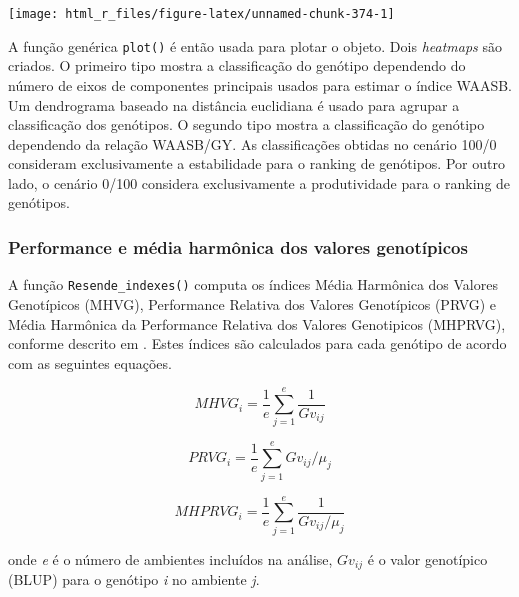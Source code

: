 \documentclass[
]{book}
\begin{document}
\begin{center}\texttt{[image: html\_r\_files/figure-latex/unnamed-chunk-374-1]} \end{center}

A função genérica \texttt{plot()}  é então usada para plotar o objeto. Dois \emph{heatmaps} são criados. O primeiro tipo mostra a classificação do genótipo dependendo do número de eixos de componentes principais usados para estimar o índice WAASB. Um dendrograma baseado na distância euclidiana é usado para agrupar a classificação dos genótipos. O segundo tipo mostra a classificação do genótipo dependendo da relação WAASB/GY. As classificações obtidas no cenário 100/0 consideram exclusivamente a estabilidade para o ranking de genótipos. Por outro lado, o cenário 0/100 considera exclusivamente a produtividade para o ranking de genótipos.

\hypertarget{performance-e-muxe9dia-harmuxf4nica-dos-valores-genotuxedpicos}{%
\subsubsection{Performance e média harmônica dos valores genotípicos}\label{performance-e-muxe9dia-harmuxf4nica-dos-valores-genotuxedpicos}}

A função \texttt{Resende\_indexes()} computa os índices Média Harmônica dos Valores Genotípicos (MHVG), Performance Relativa dos Valores Genotípicos (PRVG) e Média Harmônica da Performance Relativa dos Valores Genotipicos (MHPRVG), conforme descrito em \citet{ColombariFilho2013}. Estes índices são calculados para cada genótipo de acordo com as seguintes equações.

\[
MHVG_i = \frac{1}{e}\sum\limits_{j = 1}^e {\frac{1}{{G{v_{ij}}}}}
\]

\[
PRVG_i = \frac{1}{e}\sum\limits_{j = 1}^e {G{v_{ij}}/{\mu_j}}
\]

\[
MHPRVG_i = \frac{1}{e}\sum\limits_{j = 1}^e {\frac{1}{{G{v_{ij}}/{\mu_j}}}}
\]

onde \emph{e} é o número de ambientes incluídos na análise, \(Gv_{ij}\) é o valor genotípico (BLUP) para o genótipo \emph{i} no ambiente \emph{j}.
\end{document}
